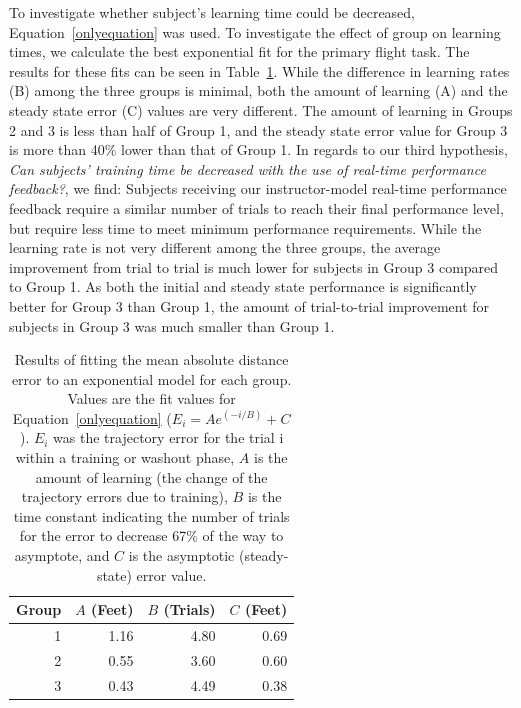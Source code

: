 \documentclass[]{aiaa-tc}%
\begin{document}
To investigate whether subject's learning time could be decreased, Equation~\ref{onlyequation} was used. To investigate the effect of group on learning times, we calculate the best exponential fit for the primary flight task. The results for these fits can be seen in Table~\ref{tab:dist_exp_fits}. While the difference in learning rates (B) among the three groups is minimal, both the amount of learning (A) and the steady state error (C) values are very different. The amount of learning in Groups 2 and 3 is less than half of Group 1, and the steady state error value for Group 3 is more than 40\% lower than that of Group 1. In regards to our third hypothesis, \textit{Can subjects' training time be decreased with the use of real-time performance feedback?}, we find: Subjects receiving our instructor-model real-time performance feedback require a similar number of trials to reach their final performance level, but require less time to meet minimum performance requirements. While the learning rate is not very different among the three groups, the average improvement from trial to trial is much lower for subjects in Group 3 compared to Group 1. As both the initial and steady state performance is significantly better for Group 3 than Group 1, the amount of trial-to-trial improvement for subjects in Group 3 was much smaller than Group 1.

\begin{table}[tb!]
  \centering
  \begin{tabular}{rrrr}
    \toprule
    Group & $A$ (Feet) & $B$ (Trials) & $C$ (Feet) \\
    \midrule
    1     & 1.16       & 4.80         & 0.69       \\
    2     & 0.55       & 3.60         & 0.60       \\
    3     & 0.43       & 4.49         & 0.38       \\
    \bottomrule
  \end{tabular}
  \caption[Results of fitting the mean absolute distance error to an exponential model for each group]{Results of fitting the mean absolute distance error to an exponential model for each group. Values are the fit values for Equation~\ref{onlyequation} ($E_i = A e^{(-i/B)} + C$). $E_i$ was the trajectory error for the trial i within a training or washout phase, $A$ is the amount of learning (the change of the trajectory errors due to training), $B$ is the time constant indicating the number of trials for the error to decrease 67\% of the way to asymptote, and $C$ is the asymptotic (steady-state) error value.}
  \label{tab:dist_exp_fits}
\end{table}
\end{document}
